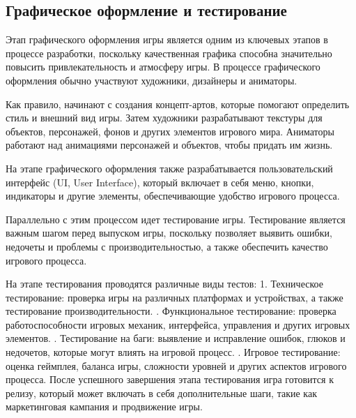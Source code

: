 \subsection{Графическое оформление и тестирование}

Этап графического оформления игры является одним из ключевых этапов в процессе разработки, поскольку качественная графика способна значительно повысить привлекательность и атмосферу игры. В процессе графического оформления обычно участвуют художники, дизайнеры и аниматоры.

Как правило, начинают с создания концепт-артов, которые помогают определить стиль и внешний вид игры. Затем художники разрабатывают текстуры для объектов, персонажей, фонов и других элементов игрового мира. Аниматоры работают над анимациями персонажей и объектов, чтобы придать им жизнь.

На этапе графического оформления также разрабатывается пользовательский интерфейс (UI, User Interface), который включает в себя меню, кнопки, индикаторы и другие элементы, обеспечивающие удобство игрового процесса.

Параллельно с этим процессом идет тестирование игры. Тестирование является важным шагом перед выпуском игры, поскольку позволяет выявить ошибки, недочеты и проблемы с производительностью, а также обеспечить качество игрового процесса.

На этапе тестирования проводятся различные виды тестов:
1. Техническое тестирование: проверка игры на различных платформах и устройствах, а также тестирование производительности.
. Функциональное тестирование: проверка работоспособности игровых механик, интерфейса, управления и других игровых элементов.
. Тестирование на баги: выявление и исправление ошибок, глюков и недочетов, которые могут влиять на игровой процесс.
. Игровое тестирование: оценка геймплея, баланса игры, сложности уровней и других аспектов игрового процесса.
\newline
После успешного завершения этапа тестирования игра готовится к релизу, который может включать в себя дополнительные шаги, такие как маркетинговая кампания и продвижение игры.